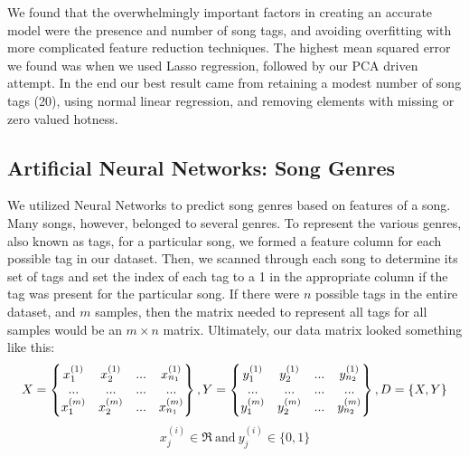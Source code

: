 \documentclass[12pt]{article}
\begin{document}
We found that the overwhelmingly important factors in creating an accurate model were the presence and number of song tags, and avoiding overfitting with more complicated feature reduction techniques. The highest mean squared error we found was when we used Lasso regression, followed by our PCA driven attempt. In the end our best result came from retaining a modest number of song tags (20), using normal linear regression, and removing elements with missing or zero valued hotness.

\subsection{Artificial Neural Networks: Song Genres}
\label{subsec:ann}
We utilized Neural Networks to predict song genres based on features of a song. Many songs, however, belonged to several genres. To represent the various genres, also known as tags, for a particular song, we formed a feature column for each possible tag in our dataset. Then, we scanned through each song to determine its set of tags and set the index of each tag to a 1 in the appropriate column if the tag was present for the particular song. If there were $n$ possible tags in the entire dataset, and $m$ samples, then the matrix needed to represent all tags for all samples would be an $m \times n$ matrix. Ultimately, our data matrix looked something like this:
\begin{equation}
    X = \begin{Bmatrix}
    	x^{(1)}_1 & x^{(1)}_2 & ... & x^{(1)}_{n_1} \\
    	...       & ...       & ... & ... \\
        x^{(m)}_1 & x^{(m)}_2 & ... & x^{(m)}_{n_1} \\
    \end{Bmatrix},
    \\
    Y = \begin{Bmatrix}
    y^{(1)}_1 & y^{(1)}_2 & ... & y^{(1)}_{n_2} \\
    ...       & ...       & ... & ... \\
    y^{(m)}_1 & y^{(m)}_2 & ... & y^{(m)}_{n_2} \\
    \end{Bmatrix},
    \\
    D = \{X,Y\}
\end{equation} 
\begin{equation}
    x^{(i)}_j \in \Re\ \text{and}\ y^{(i)}_j \in \{0, 1\}
\end{equation}
\end{document}
